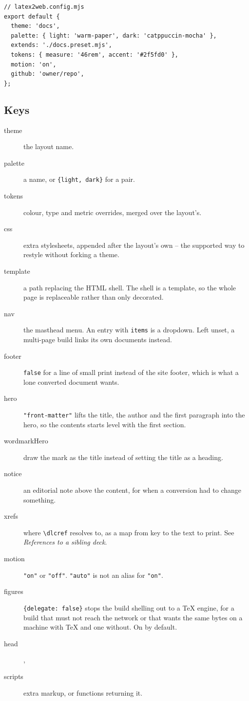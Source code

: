 \documentclass[11pt]{article}
\begin{document}
\begin{verbatim}
// latex2web.config.mjs
export default {
  theme: 'docs',
  palette: { light: 'warm-paper', dark: 'catppuccin-mocha' },
  extends: './docs.preset.mjs',
  tokens: { measure: '46rem', accent: '#2f5fd0' },
  motion: 'on',
  github: 'owner/repo',
};
\end{verbatim}

\subsection{Keys}

\begin{description}
  \item[theme] the layout name.
  \item[palette] a name, or \texttt{\{light, dark\}} for a pair.
  \item[tokens] colour, type and metric overrides, merged over the layout's.
  \item[css] extra stylesheets, appended after the layout's own -- the supported
    way to restyle without forking a theme.
  \item[template] a path replacing the HTML shell. The shell is a template, so
    the whole page is replaceable rather than only decorated.
  \item[nav] the masthead menu. An entry with \texttt{items} is a dropdown. Left
    unset, a multi-page build links its own documents instead.
  \item[footer] \texttt{false} for a line of small print instead of the site
    footer, which is what a lone converted document wants.
  \item[hero] \texttt{"front-matter"} lifts the title, the author and the first
paragraph into the hero, so the contents starts level with the first section.
  \item[wordmarkHero] draw the mark as the title instead of setting the title
    as a heading.
  \item[notice] an editorial note above the content, for when a conversion had
    to change something.
  \item[xrefs] where \texttt{\textbackslash dlcref} resolves to, as a map from key
    to the text to print. See \emph{References to a sibling deck}.
  \item[motion] \texttt{"on"} or \texttt{"off"}. \texttt{"auto"} is not an alias
    for \texttt{"on"}.
  \item[figures] \texttt{\{delegate: false\}} stops the build shelling out to a TeX
    engine, for a build that must not reach the network or that wants the same
    bytes on a machine with TeX and one without. On by default.
  \item[head], \item[scripts] extra markup, or functions returning it.
\end{description}
\end{document}
